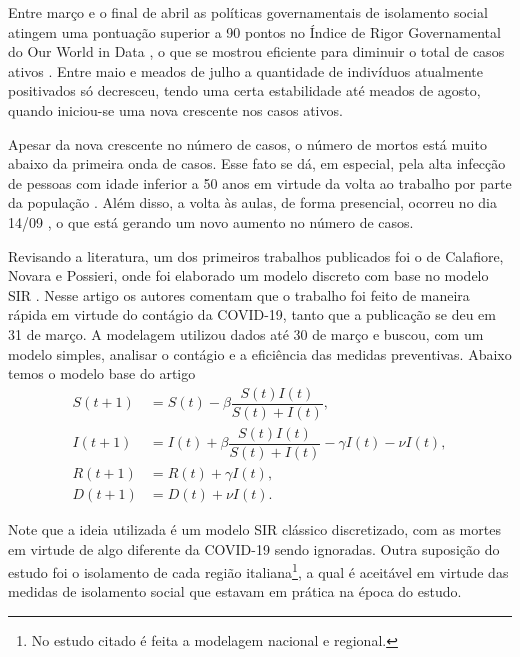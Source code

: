 \documentclass{article}
\begin{document}
Entre março e o final de abril as políticas governamentais de isolamento social atingem uma pontuação superior a 90 pontos no Índice de Rigor Governamental do Our World in Data \cite{owid}, o que se mostrou eficiente para diminuir o total de casos ativos \cite{italia}. Entre maio e meados de julho a quantidade de indivíduos atualmente positivados só decresceu, tendo uma certa estabilidade até meados de agosto, quando iniciou-se uma nova crescente nos casos ativos.

Apesar da nova crescente no número de casos, o número de mortos está muito abaixo da primeira onda de casos. Esse fato se dá, em especial, pela alta infecção de pessoas com idade inferior a 50 anos \cite{istoe_idade} em virtude da volta ao trabalho por parte da população \cite{folha_trabalho}. Além disso, a volta às aulas, de forma presencial, ocorreu no dia 14/09 \cite{uol_aulas}, o que está gerando um novo aumento no número de casos.

Revisando a literatura, um dos primeiros trabalhos publicados foi o de Calafiore, Novara e Possieri, onde foi elaborado um modelo discreto com base no modelo SIR \cite{calafiore2020modified}. Nesse artigo os autores comentam que o trabalho foi feito de maneira rápida em virtude do contágio da COVID-19, tanto que a publicação se deu em 31 de março. A modelagem utilizou dados até 30 de março e buscou, com um modelo simples, analisar o contágio e a eficiência das medidas preventivas. Abaixo temos o modelo base do artigo
\begin{equation*}
    \begin{split}
        S(t + 1) & = S(t) - \beta \dfrac{S(t) I(t)}{S(t) + I(t)}, \\
        I(t + 1) & = I(t) + \beta \dfrac{S(t) I(t)}{S(t) + I(t)} - \gamma I(t) - \nu I(t), \\
        R(t + 1) & = R(t) + \gamma I(t), \\
        D(t + 1) & = D(t) + \nu I(t).
    \end{split}
\end{equation*}

Note que a ideia utilizada é um modelo SIR clássico discretizado, com as mortes em virtude de algo diferente da COVID-19 sendo ignoradas. Outra suposição do estudo foi o isolamento de cada região italiana\footnote{No estudo citado é feita a modelagem nacional e regional.}, a qual é aceitável em virtude das medidas de isolamento social que estavam em prática na época do estudo.
\end{document}
